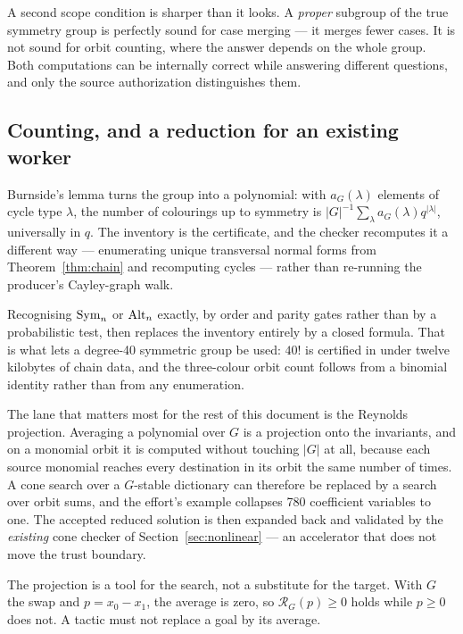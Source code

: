A second scope condition is sharper than it looks. A \emph{proper} subgroup of
the true symmetry group is perfectly sound for case merging --- it merges
fewer cases. It is not sound for orbit counting, where the answer depends on
the whole group. Both computations can be internally correct while answering
different questions, and only the source authorization distinguishes them.

\subsection{Counting, and a reduction for an existing worker}

Burnside's lemma turns the group into a polynomial: with $a_G(\lambda)$
elements of cycle type $\lambda$, the number of colourings up to symmetry is
$|G|^{-1}\sum_\lambda a_G(\lambda)q^{|\lambda|}$, universally in $q$. The
inventory is the certificate, and the checker recomputes it a different way ---
enumerating unique transversal normal forms from Theorem~\ref{thm:chain} and
recomputing cycles --- rather than re-running the producer's Cayley-graph walk.

Recognising $\operatorname{Sym}_n$ or $\operatorname{Alt}_n$ exactly, by order and parity gates rather than
by a probabilistic test, then replaces the inventory entirely by a closed
formula. That is what lets a degree-40 symmetric group be used: $40!$ is
certified in under twelve kilobytes of chain data, and the three-colour orbit
count follows from a binomial identity rather than from any enumeration.

The lane that matters most for the rest of this document is the Reynolds
projection. Averaging a polynomial over $G$ is a projection onto the invariants,
and on a monomial orbit it is computed without touching $|G|$ at all, because
each source monomial reaches every destination in its orbit the same number of
times. A cone search over a $G$-stable dictionary can therefore be replaced by
a search over orbit sums, and the effort's example collapses 780 coefficient
variables to one. The accepted reduced solution is then expanded back and
validated by the \emph{existing} cone checker of Section~\ref{sec:nonlinear} ---
an accelerator that does not move the trust boundary.

\begin{remark}
The projection is a tool for the search, not a substitute for the target. With
$G$ the swap and $p=x_0-x_1$, the average is zero, so $\mathcal{R}_G(p)\ge0$ holds
while $p\ge0$ does not. A tactic must not replace a goal by its average.
\end{remark}

